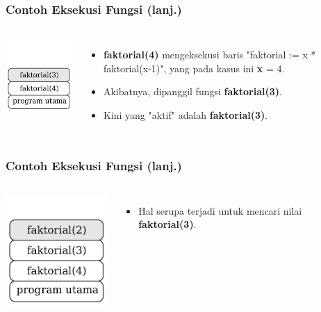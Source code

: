 \begin{frame}
\frametitle{Contoh Eksekusi Fungsi (lanj.)}
\begin{columns}
    \centering
    \includegraphics[width=4cm]{asset/rekursi-3.pdf}
    \begin{itemize}
      \item \textbf{faktorial(4)} mengeksekusi baris "faktorial := x * faktorial(x-1)", yang pada kasus ini \textbf{x} = 4.
      \item Akibatnya, dipanggil fungsi \textbf{faktorial(3)}. 
      \item Kini yang "aktif" adalah \textbf{faktorial(3)}.
    \end{itemize}
  \end{columns} 
\end{frame}

\begin{frame}
\frametitle{Contoh Eksekusi Fungsi (lanj.)}
\begin{columns}
    \centering
    \includegraphics[width=4cm]{asset/rekursi-4.pdf}
    \begin{itemize}
      \item Hal serupa terjadi untuk mencari nilai \textbf{faktorial(3)}.
    \end{itemize}
  \end{columns} 
\end{frame}

